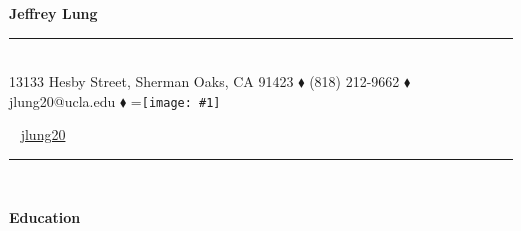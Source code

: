\documentclass[11pt]{article}
\newcommand{\textimagesmall}[2]{
	\begingroup
	\setbox0=\hbox{\texttt{[image: \#1]}}%
	\parbox{\wd0}{\box0}\endgroup ~ #2%
}
\begin{document}
\begin{center}

{\Huge \textbf{Jeffrey Lung}}
\rule[13pt]{\textwidth}{1pt} \\ \vspace{-16pt}
13133 Hesby Street, Sherman Oaks, CA 91423 $\blacklozenge$ (818) 212-9662 $\blacklozenge$ jlung20@ucla.edu $\blacklozenge$ \textimagesmall{github.png}{\href{https://github.com/jlung20/}{jlung20}}
\rule[13pt]{\textwidth}{1pt} \\ \vspace{-16pt}
\end{center}
\setlength{\parindent}{0.55em}\par
\textbf{\Large Education} \vspace{4pt}
\setlength{\parindent}{1.5em}\par
\end{document}
